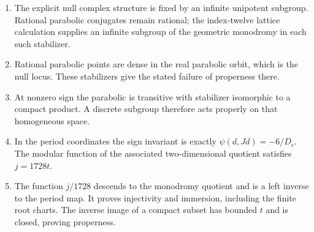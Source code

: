 \RungOne
\begin{enumerate}[label=\arabic*.]
\item The explicit null complex structure is fixed by an infinite
unipotent subgroup. Rational parabolic conjugates remain rational;
the index-twelve lattice calculation supplies an infinite subgroup
of the geometric monodromy in each such stabilizer.
\item Rational parabolic points are dense in the real parabolic
orbit, which is the null locus. These stabilizers give the stated
failure of properness there.
\item At nonzero sign the parabolic is transitive with stabilizer
isomorphic to a compact product. A discrete subgroup therefore acts
properly on that homogeneous space.
\item In the period coordinates the sign invariant is exactly
$\psi(d,Jd)=-6/D_c$. The modular function of the associated
two-dimensional quotient satisfies $j=1728t$.
\item The function $j/1728$ descends to the monodromy quotient
and is a left inverse to the period map. It proves injectivity
and immersion, including the finite root charts. The inverse
image of a compact subset has bounded $t$ and is closed, proving
properness.
\end{enumerate}

